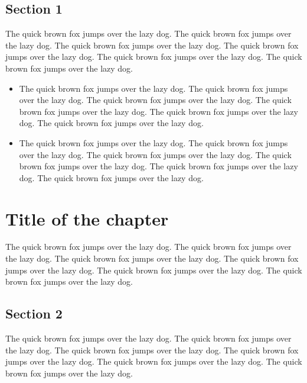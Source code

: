 \documentclass[11pt,a4paper]{report}
\begin{document}
\section{Section 1}
\label{sec:sec1}

The quick brown fox jumps over the lazy dog. The quick brown fox jumps over the lazy dog. The quick brown fox jumps over the lazy dog. The quick brown fox jumps over the lazy dog. The quick brown fox jumps over the lazy dog. The quick brown fox jumps over the lazy dog. 

\begin{itemize}
    \item The quick brown fox jumps over the lazy dog. The quick brown fox jumps over the lazy dog. The quick brown fox jumps over the lazy dog. The quick brown fox jumps over the lazy dog. The quick brown fox jumps over the lazy dog. The quick brown fox jumps over the lazy dog. 
    \item The quick brown fox jumps over the lazy dog. The quick brown fox jumps over the lazy dog. The quick brown fox jumps over the lazy dog. The quick brown fox jumps over the lazy dog. The quick brown fox jumps over the lazy dog. The quick brown fox jumps over the lazy dog. 
\end{itemize}

\chapter{Title of the chapter}
\label{cap:name2}

The quick brown fox jumps over the lazy dog. The quick brown fox jumps over the lazy dog. The quick brown fox jumps over the lazy dog. The quick brown fox jumps over the lazy dog. The quick brown fox jumps over the lazy dog. The quick brown fox jumps over the lazy dog. 

\section{Section 2}
\label{sec:sec2}

The quick brown fox jumps over the lazy dog. The quick brown fox jumps over the lazy dog. The quick brown fox jumps over the lazy dog. The quick brown fox jumps over the lazy dog. The quick brown fox jumps over the lazy dog. The quick brown fox jumps over the lazy dog. 


\printbibliography[title={References}]
\end{document}
